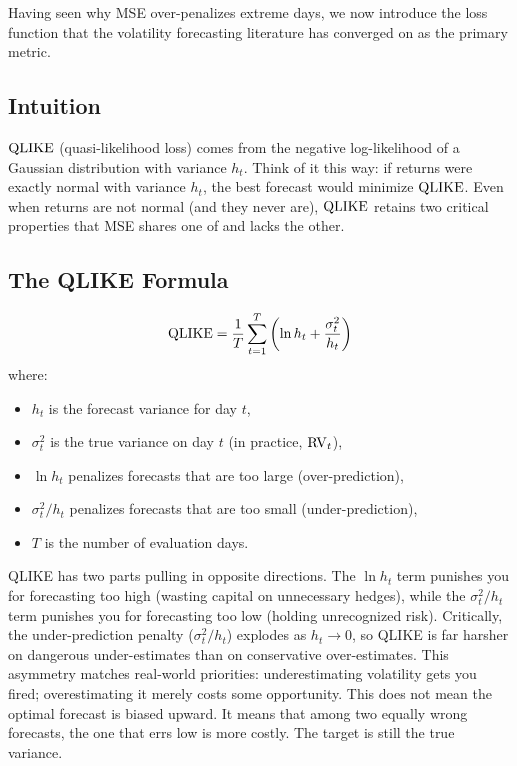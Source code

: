 Having seen why MSE over-penalizes extreme days, we now introduce the loss function that the volatility forecasting literature has converged on as the primary metric.

\subsection{Intuition}

$\operatorname{QLIKE}$ (quasi-likelihood loss) comes from the negative log-likelihood of a Gaussian distribution with variance $h_t$.
Think of it this way: if returns were exactly normal with variance $h_t$, the best forecast would minimize $\operatorname{QLIKE}$.
Even when returns are not normal (and they never are), $\operatorname{QLIKE}$ retains two critical properties that MSE shares one of and lacks the other.

\subsection{The QLIKE Formula}

\begin{equation}
\label{eq:qlike}
\operatorname{QLIKE} = \frac{1}{T}\sum_{t=1}^{T} \left(\ln h_t + \frac{\sigma^2_t}{h_t}\right)
\end{equation}
where:
\begin{itemize}[nosep]
  \item $h_t$ is the forecast variance for day $t$,
  \item $\sigma^2_t$ is the true variance on day $t$ (in practice, $\operatorname{RV}_t$),
  \item $\ln h_t$ penalizes forecasts that are too large (over-prediction),
  \item $\sigma^2_t / h_t$ penalizes forecasts that are too small (under-prediction),
  \item $T$ is the number of evaluation days.
\end{itemize}

\begin{intuition}
QLIKE has two parts pulling in opposite directions.
The $\ln h_t$ term punishes you for forecasting too high (wasting capital on unnecessary hedges), while the $\sigma^2_t / h_t$ term punishes you for forecasting too low (holding unrecognized risk).
Critically, the under-prediction penalty ($\sigma^2_t / h_t$) explodes as $h_t \to 0$, so QLIKE is far harsher on dangerous under-estimates than on conservative over-estimates.
This asymmetry matches real-world priorities: underestimating volatility gets you fired; overestimating it merely costs some opportunity.
This does not mean the optimal forecast is biased upward.
It means that among two equally wrong forecasts, the one that errs low is more costly.
The target is still the true variance.
\end{intuition}

